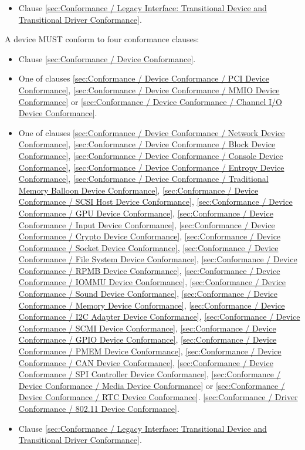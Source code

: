\begin{description}
\begin{itemize}
    \item Clause \ref{sec:Conformance / Legacy Interface: Transitional Device and Transitional Driver Conformance}.
  \end{itemize}
\item[Device] A device MUST conform to four conformance clauses:
  \begin{itemize}
    \item Clause \ref{sec:Conformance / Device Conformance}.
    \item One of clauses \ref{sec:Conformance / Device Conformance / PCI Device Conformance}, \ref{sec:Conformance / Device Conformance / MMIO Device Conformance} or \ref{sec:Conformance / Device Conformance / Channel I/O Device Conformance}.
    \item One of clauses 
\ref{sec:Conformance / Device Conformance / Network Device Conformance}, 
\ref{sec:Conformance / Device Conformance / Block Device Conformance}, 
\ref{sec:Conformance / Device Conformance / Console Device Conformance}, 
\ref{sec:Conformance / Device Conformance / Entropy Device Conformance}, 
\ref{sec:Conformance / Device Conformance / Traditional Memory Balloon Device Conformance}, 
\ref{sec:Conformance / Device Conformance / SCSI Host Device Conformance}, 
\ref{sec:Conformance / Device Conformance / GPU Device Conformance},
\ref{sec:Conformance / Device Conformance / Input Device Conformance}, 
\ref{sec:Conformance / Device Conformance / Crypto Device Conformance}, 
\ref{sec:Conformance / Device Conformance / Socket Device Conformance}, 
\ref{sec:Conformance / Device Conformance / File System Device Conformance},
\ref{sec:Conformance / Device Conformance / RPMB Device Conformance},
\ref{sec:Conformance / Device Conformance / IOMMU Device Conformance},
\ref{sec:Conformance / Device Conformance / Sound Device Conformance},
\ref{sec:Conformance / Device Conformance / Memory Device Conformance},
\ref{sec:Conformance / Device Conformance / I2C Adapter Device Conformance},
\ref{sec:Conformance / Device Conformance / SCMI Device Conformance},
\ref{sec:Conformance / Device Conformance / GPIO Device Conformance},
\ref{sec:Conformance / Device Conformance / PMEM Device Conformance},
\ref{sec:Conformance / Device Conformance / CAN Device Conformance},
\ref{sec:Conformance / Device Conformance / SPI Controller Device Conformance},
\ref{sec:Conformance / Device Conformance / Media Device Conformance} or
\ref{sec:Conformance / Device Conformance / RTC Device Conformance}.
\ref{sec:Conformance / Driver Conformance / 802.11 Device Conformance}.

    \item Clause \ref{sec:Conformance / Legacy Interface: Transitional Device and Transitional Driver Conformance}.
  \end{itemize}
\end{description}

